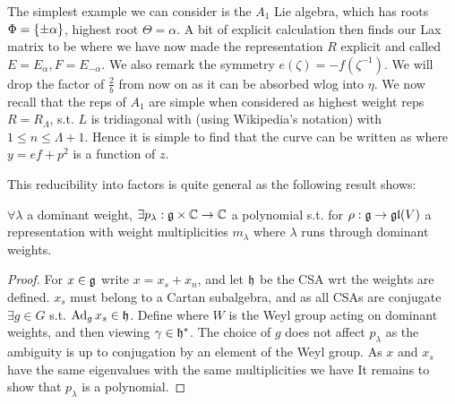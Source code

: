 \documentclass{article}
\begin{document}
\begin{example}
	The simplest example we can consider is the $A_1$ Lie algebra, which has roots $\Phi = \left\{ \pm \alpha \right\}$, highest root $\Theta=\alpha$. A bit of explicit calculation then finds our Lax matrix to be 
where we have now made the representation $R$ explicit and called $E = E_\alpha, F = E_{-\alpha}$. We also remark the symmetry $e(\zeta) = -f(\zeta^{-1})$. We will drop the factor of $\frac{2}{b}$ from now on as it can be absorbed wlog into $\eta$. We now recall that the reps of $A_1$ are simple when considered as highest weight reps $R=R_\Lambda$, s.t. $L$ is tridiagonal with (using Wikipedia's notation)
with $1 \leq n \leq \Lambda+1$. Hence it is simple to find that the curve can be written as 
where $y = ef+p^2$ is a function of $z$.
\end{example}

This reducibility into factors is quite general as the following result shows: 
\begin{prop}
	$\forall \lambda$ a dominant weight, $\exists p_\lambda : \mathfrak{g} \times \mathbb{C} \to \mathbb{C}$ a polynomial s.t. for $\rho:\mathfrak{g} \to \mathfrak{gl}(V)$ a representation with weight multiplicities $m_\lambda$ 
where $\lambda$ runs through dominant weights. 
\end{prop}
\begin{proof}
	For $x \in \mathfrak{g}$ write $x=x_s + x_n$, and let $\mathfrak{h}$ be the CSA wrt the weights are defined. $x_s$ must belong to a Cartan subalgebra, and as all CSAs are conjugate $\exists g \in G$ s.t. $\operatorname{Ad}_g x_s \in \mathfrak{h}$. Define 
where $W$ is the Weyl group acting on dominant weights, and then viewing $\gamma \in \mathfrak{h}^\ast$. The choice of $g$ does not affect $p_\lambda$ as the ambiguity is up to conjugation by an element of the Weyl group. As $x$ and $x_s$ have the same eigenvalues with the same multiplicities we have 
It remains to show that $p_\lambda$ is a polynomial. 
\end{proof}
\end{document}

